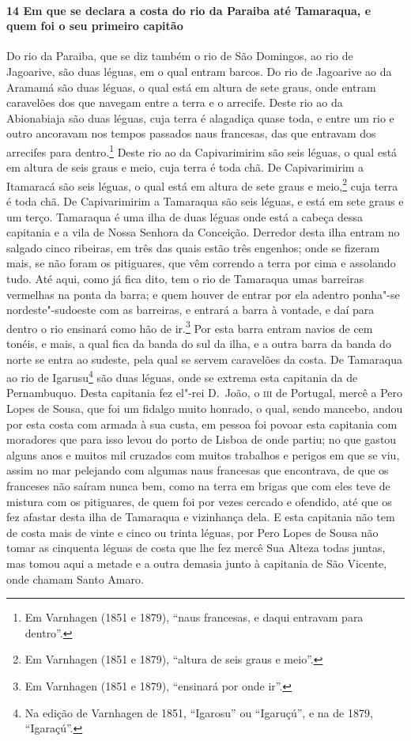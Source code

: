 \begin{linenumbers}
\paragraph{14 Em que se declara a costa do rio da Paraiba até Tamaraqua, e quem foi o seu
primeiro capitão} \quad
Do rio da Paraiba, que se diz também o rio de São Domingos, ao rio de Jagoarive, são duas
léguas, em o qual entram barcos. Do rio de Jagoarive ao da Aramamá são duas léguas, o qual
está em altura de sete graus, onde entram caravelões dos que navegam entre a terra e o
arrecife. Deste rio ao da Abionabiaja são duas léguas, cuja terra é alagadiça quase toda,
e entre um rio e outro ancoravam nos tempos passados naus francesas, das que entravam dos
arrecifes para dentro.\footnote{ Em Varnhagen (1851 e 1879), ``naus francesas, e daqui
entravam para dentro''.} Deste rio ao da Capivarimirim são seis léguas, o qual está em
altura de seis graus e meio, cuja terra é toda chã. De Capivarimirim a Itamaracá são seis
léguas, o qual está em altura de sete graus e meio,\footnote{ Em Varnhagen (1851 e 1879),
``altura de seis graus e meio''.} cuja terra é toda chã. De Capivarimirim a Tamaraqua são
seis léguas, e está em sete graus e um terço. Tamaraqua é uma ilha de duas léguas onde
está a cabeça dessa capitania e a vila de Nossa Senhora da Conceição. Derredor desta ilha
entram no salgado cinco ribeiras, em três das quais estão três engenhos; onde se fizeram
mais, se não foram os pitiguares, que vêm correndo a terra por cima e assolando tudo. Até
aqui, como já fica dito, tem o rio de Tamaraqua umas barreiras vermelhas na ponta da
barra; e quem houver de entrar por ela adentro ponha"-se nordeste"-sudoeste com as
barreiras, e entrará a barra à vontade, e daí para dentro o rio ensinará como hão de
ir.\footnote{ Em Varnhagen (1851 e 1879), ``ensinará por onde ir''.} Por esta barra entram
navios de cem tonéis, e mais, a qual fica da banda do sul da ilha, e a outra barra da
banda do norte se entra ao sudeste, pela qual se servem caravelões da costa. De Tamaraqua
ao rio de Igarusu\footnote{ Na edição de Varnhagen de 1851, ``Igarosu'' ou ``Igaruçú'', e
na de 1879, ``Igaraçú''.} são duas léguas, onde se extrema esta capitania da de
Pernambuquo. Desta capitania fez el"-rei D.~João, o \textsc{iii} de Portugal, mercê a Pero
Lopes de Sousa, que foi um fidalgo muito honrado, o qual, sendo mancebo, andou por esta
costa com armada à sua custa, em pessoa foi povoar esta capitania com moradores que para
isso levou do porto de Lisboa de onde partiu; no que gastou alguns anos e muitos mil
cruzados com muitos trabalhos e perigos em que se viu, assim no mar pelejando com algumas
naus francesas que encontrava, de que os franceses não saíram nunca bem, como na terra em
brigas que com eles teve de mistura com os pitiguares, de quem foi por vezes cercado e
ofendido, até que os fez afastar desta ilha de Tamaraqua e vizinhança dela. E esta
capitania não tem de costa mais de vinte e cinco ou trinta léguas, por Pero Lopes de Sousa
não tomar as cinquenta léguas de costa que lhe fez mercê Sua Alteza todas juntas, mas
tomou aqui a metade e a outra demasia junto à capitania de São Vicente, onde chamam Santo
Amaro.


\end{linenumbers}
